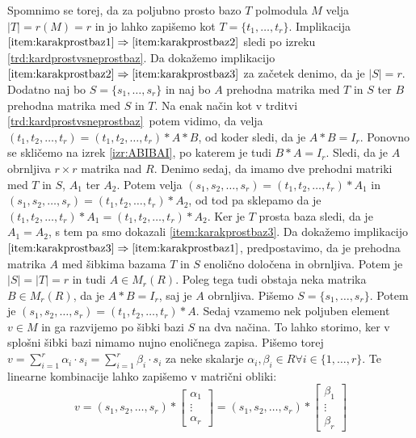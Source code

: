 \documentclass[mat1]{fmfdelo}
\newcommand{\abs}[1]{\ensuremath{\lvert #1 \rvert}}
\begin{document}
\begin{dokaz}
Spomnimo se torej, da za poljubno prosto bazo $T$ polmodula $M$ velja $\abs{T} = r(M) = r$ in jo lahko zapišemo kot $T = \{t_1, \ldots, t_r\}$. Implikacija $\ref{item:karakprostbaz1}\Rightarrow \ref{item:karakprostbaz2}$ sledi po izreku \ref{trd:kardprostvsneprostbaz}. Da dokažemo implikacijo $\ref{item:karakprostbaz2}\Rightarrow \ref{item:karakprostbaz3}$ za začetek denimo, da je $\abs{S} = r$. Dodatno naj bo $S = \{s_1, \ldots, s_r\}$ in naj bo $A$ prehodna matrika med $T$ in $S$ ter $B$ prehodna matrika med $S$ in $T$. Na enak način kot v trditvi \ref{trd:kardprostvsneprostbaz}~potem vidimo, da velja $(t_1, t_2, \ldots, t_r) = (t_1, t_2, \ldots, t_r)*A*B$, od koder sledi, da je $A*B = I_r$. Ponovno se skličemo na izrek \ref{izr:ABIBAI}, po katerem je tudi $B*A = I_r$. Sledi, da je $A$ obrnljiva $r\times r$ matrika nad $R$. Denimo sedaj, da imamo dve prehodni matriki med $T$ in $S$, $A_1$ ter $A_2$. Potem velja $(s_1, s_2, \ldots, s_r) = (t_1, t_2, \ldots, t_r)*A_1$ in $(s_1, s_2, \ldots, s_r) = (t_1, t_2, \ldots, t_r)*A_2$, od tod pa sklepamo da je $(t_1, t_2, \ldots, t_r)*A_1 = (t_1, t_2, \ldots, t_r)*A_2$. Ker je $T$ prosta baza sledi, da je $A_1 = A_2$, s tem pa smo dokazali \ref{item:karakprostbaz3}. Da dokažemo implikacijo $\ref{item:karakprostbaz3}\Rightarrow \ref{item:karakprostbaz1}$, predpostavimo, da je prehodna matrika $A$ med šibkima bazama $T$ in $S$ enolično določena in obrnljiva. Potem je $\abs{S} = \abs{T} = r$ in tudi $A\in M_r(R)$. Poleg tega tudi obstaja neka matrika $B\in M_r(R)$, da je $A*B =I_r$, saj je $A$ obrnljiva. Pišemo $S = \{s_1,\ldots,s_r\}$. Potem je $(s_1, s_2, \ldots, s_r) = (t_1, t_2, \ldots, t_r)*A$. Sedaj vzamemo nek poljuben element $v\in M$ in ga razvijemo po šibki bazi $S$ na dva načina. To lahko storimo, ker v splošni šibki bazi nimamo nujno enoličnega zapisa. Pišemo torej $v = \sum_{i = 1}^{r}\alpha_i\cdot s_i = \sum_{i = 1}^{r} \beta_i \cdot s_i$ za neke skalarje $\alpha_i, \beta_i \in R \forall i\in \{1, \ldots, r\}$. Te linearne kombinacije lahko zapišemo v matrični obliki: $$ v = (s_1, s_2, \ldots, s_r)*\begin{bmatrix}
	\alpha_1 \\
	\vdots \\
	\alpha_r 
\end{bmatrix} = (s_1, s_2, \ldots, s_r)*\begin{bmatrix}
\beta_1 \\
\vdots \\
\beta_r 
\end{bmatrix}$$

\end{dokaz}
\end{document}
